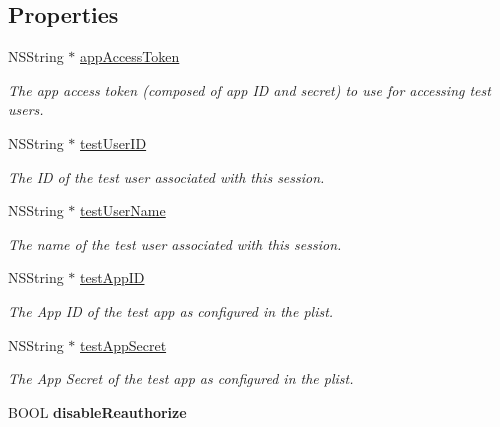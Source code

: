 \subsection*{Properties}
\begin{DoxyCompactItemize}
\item 
\mbox{\label{interfaceFBTestSession_a130a337b8dac51ea52fafa5285a8e609}} 
N\+S\+String $\ast$ \hyperlink{interfaceFBTestSession_a130a337b8dac51ea52fafa5285a8e609}{app\+Access\+Token}
\begin{DoxyCompactList}\small\item\em The app access token (composed of app ID and secret) to use for accessing test users. \end{DoxyCompactList}\item 
\mbox{\label{interfaceFBTestSession_a760d59618a12f2a9ebd9b0302282b4ff}} 
N\+S\+String $\ast$ \hyperlink{interfaceFBTestSession_a760d59618a12f2a9ebd9b0302282b4ff}{test\+User\+ID}
\begin{DoxyCompactList}\small\item\em The ID of the test user associated with this session. \end{DoxyCompactList}\item 
\mbox{\label{interfaceFBTestSession_a7c8786eacb2b2909f381d2870a4bc199}} 
N\+S\+String $\ast$ \hyperlink{interfaceFBTestSession_a7c8786eacb2b2909f381d2870a4bc199}{test\+User\+Name}
\begin{DoxyCompactList}\small\item\em The name of the test user associated with this session. \end{DoxyCompactList}\item 
\mbox{\label{interfaceFBTestSession_a7db74c6400082de390c619200b0c3b07}} 
N\+S\+String $\ast$ \hyperlink{interfaceFBTestSession_a7db74c6400082de390c619200b0c3b07}{test\+App\+ID}
\begin{DoxyCompactList}\small\item\em The App ID of the test app as configured in the plist. \end{DoxyCompactList}\item 
\mbox{\label{interfaceFBTestSession_ac5f3ca9796a590512a0eb6cf8692df25}} 
N\+S\+String $\ast$ \hyperlink{interfaceFBTestSession_ac5f3ca9796a590512a0eb6cf8692df25}{test\+App\+Secret}
\begin{DoxyCompactList}\small\item\em The App Secret of the test app as configured in the plist. \end{DoxyCompactList}\item 
\mbox{\label{interfaceFBTestSession_aad48e706aa6024634e7bc102913b6905}} 
B\+O\+OL {\bfseries disable\+Reauthorize}
\end{DoxyCompactItemize}
